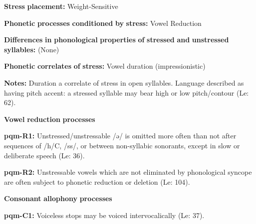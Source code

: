 \begin{styleBody}
\textbf{Stress} \textbf{placement:} Weight-Sensitive
\end{styleBody}

\begin{styleBody}
\textbf{Phonetic} \textbf{processes} \textbf{conditioned} \textbf{by} \textbf{stress:} Vowel Reduction
\end{styleBody}

\begin{styleBody}
\textbf{Differences} \textbf{in} \textbf{phonological} \textbf{properties} \textbf{of} \textbf{stressed} \textbf{and} \textbf{unstressed} \textbf{syllables:} (None)
\end{styleBody}

\begin{styleBody}
\textbf{Phonetic} \textbf{correlates} \textbf{of} \textbf{stress:} Vowel duration (impressionistic)
\end{styleBody}

\begin{styleBody}
\textbf{Notes:} Duration a correlate of stress in open syllables. Language described as having pitch accent: a stressed syllable may bear high or low pitch/contour (Le\citealt{Sourd1993}: 62).
\end{styleBody}

\begin{styleBody}
\textbf{Vowel} \textbf{reduction} \textbf{processes}
\end{styleBody}

\begin{styleBody}
\textbf{pqm-R1:} Unstressed/unstressable /ə/ is omitted more often than not after sequences of /h/C, /ss/, or between non-syllabic sonorants, except in slow or deliberate speech (Le\citealt{Sourd1996}: 36).
\end{styleBody}

\begin{styleBody}
\textbf{pqm-R2:} Unstressable vowels which are not eliminated by phonological syncope are often subject to phonetic reduction or deletion (Le\citealt{Sourd1996}: 104).
\end{styleBody}

\begin{styleBody}
\textbf{Consonant} \textbf{allophony} \textbf{processes}
\end{styleBody}

\begin{styleBody}
\textbf{pqm-C1:} Voiceless stops may be voiced intervocalically (Le\citealt{Sourd1993}: 37).
\end{styleBody}

